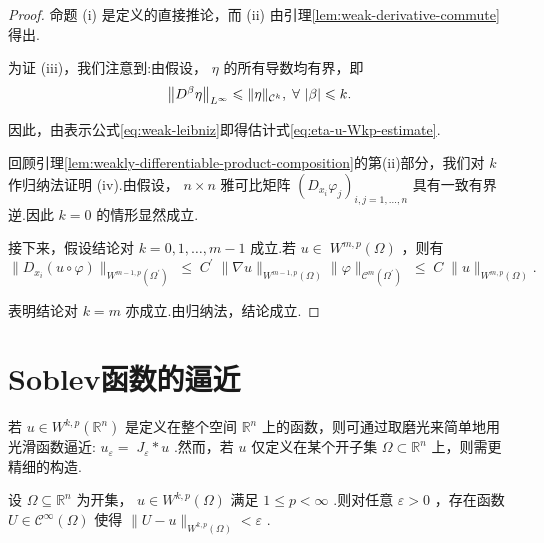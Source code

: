 \begin{proof}
命题 (i) 是定义的直接推论，而 (ii) 由引理\ref{lem:weak-derivative-commute}得出.

为证 (iii)，我们注意到:由假设， $\eta$ 的所有导数均有界，即
\[
{\norm{D^{\beta }\eta }}_{{L}^{\infty }} \leqslant  \| \eta {\| }_{{\mathcal{C}}^{k}},\;\forall\,\left| \beta \right|  \leqslant  k.
\]

因此，由表示公式\eqref{eq:weak-leibniz}即得估计式\eqref{eq:eta-u-Wkp-estimate}.

回顾引理\ref{lem:weakly-differentiable-product-composition}的第(ii)部分，我们对 $k$ 作归纳法证明 (iv).由假设， $n \times  n$ 雅可比矩阵 ${\left( {D}_{{x}_{i}}{\varphi }_{j}\right) }_{i,j = 1,\ldots ,n}$ 具有一致有界逆.因此 $k = 0$ 的情形显然成立.

接下来，假设结论对 $k = 0,1,\ldots ,m - 1$ 成立.若 $u \in \; {W}^{m,p}\left( \Omega \right)$ ，则有
\[
\| {D}_{{x}_{i}}\left( {u \circ  \varphi }\right) {\| }_{{W}^{m - 1,p}\left( {\Omega }^{\prime }\right) }\; \leq  \;{C}^{\prime }\;\| \nabla u{\| }_{{W}^{m - 1,p}\left( \Omega \right) }\| \varphi {\| }_{{\mathcal{C}}^{m}\left( {\Omega }^{\prime }\right) }\; \leq  \;C\;\| u{\| }_{{W}^{m,p}\left( \Omega \right) }.
\]

表明结论对 $k = m$ 亦成立.由归纳法，结论成立.
\end{proof}

\section{Soblev函数的逼近}

若 $u \in  {W}^{k,p}\left( {\mathbb{R}}^{n}\right)$ 是定义在整个空间 ${\mathbb{R}}^{n}$ 上的函数，则可通过取磨光来简单地用光滑函数逼近: ${u}_{\varepsilon } = \; {J}_{\varepsilon } * u$ .然而，若 $u$ 仅定义在某个开子集 $\Omega  \subset  {\mathbb{R}}^{n}$ 上，则需更精细的构造.

\begin{theorem}[用光滑函数逼近]\label{thm:approximation-by-smooth-functions}
设 $\Omega  \subseteq  {\mathbb{R}}^{n}$ 为开集， $u \in  {W}^{k,p}\left( \Omega \right)$ 满足 $1 \leq  p < \infty$ .则对任意 $\varepsilon  > 0$ ，存在函数 $U \in  {\mathcal{C}}^{\infty }\left( \Omega \right)$ 使得 $\| U - u{\| }_{{W}^{k,p}\left( \Omega \right) } < \varepsilon$ .
\end{theorem}

